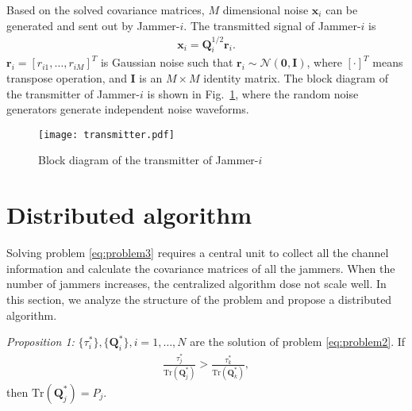 \documentclass[conference]{IEEEtran}
\begin{document}
Based on the solved covariance matrices,  $M$ dimensional noise $\mathbf{x}_i$ can be generated and sent out by Jammer-$i$. The transmitted signal of Jammer-$i$ is 
\begin{eqnarray}
\mathbf{x}_i = \mathbf{Q}_i^{1/2}\mathbf{r}_i.
\end{eqnarray} 
$\mathbf{r}_i = [r_{i1},\ldots,r_{iM}]^T$ is Gaussian noise such that $\mathbf{r}_i \sim \mathcal{N}(\mathbf{0},\mathbf{I})$, where $[\cdot]^T$ means transpose operation, and $\mathbf{I}$ is an $M \times M$ identity matrix. 
The block diagram of the transmitter of Jammer-$i$ is shown in Fig.~\ref{fig:transmitter}, where the random noise generators generate independent noise waveforms.
\begin{figure}[h]
	\centering
	\texttt{[image: transmitter.pdf]} %
	\caption{Block diagram of the transmitter of Jammer-$i$}
	\label{fig:transmitter}
\end{figure}

\section{Distributed algorithm} \label{sec:distributed algorithm}
Solving problem \eqref{eq:problem3} requires a central unit to collect all the channel information and calculate the covariance matrices of all the jammers. When the number of jammers increases, the centralized algorithm dose not scale well. In this section, we analyze the structure of the problem and propose a distributed algorithm. 

\emph{Proposition 1:} $\{\tau_i^*\}, \{\mathbf{Q}_i^*\}, i = 1, \ldots, N$ are the solution of problem \eqref{eq:problem2}. If 
\begin{eqnarray}
\frac{\tau_j^*}{\mathrm{Tr}(\mathbf{Q}_j^*)} > \frac{\tau_k^*}{\mathrm{Tr}(\mathbf{Q}_k^*)} \label{eq:efficiency},
\end{eqnarray}
then $\mathrm{Tr}(\mathbf{Q}_j^*) = P_j$.
\end{document}

